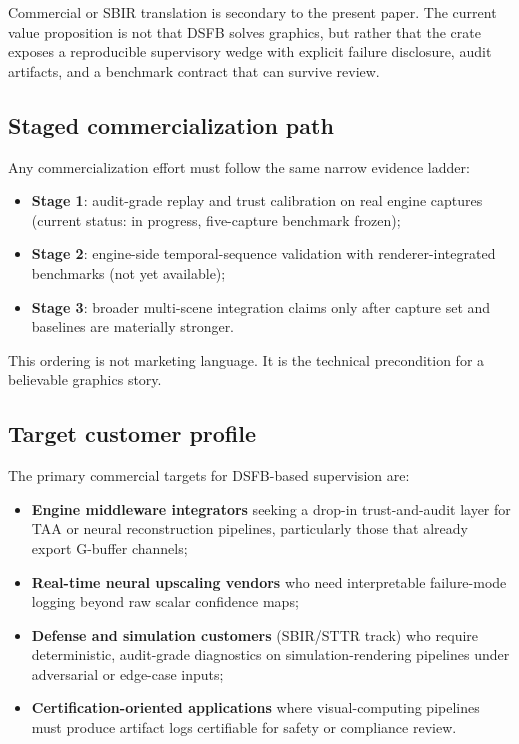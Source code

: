 \documentclass[11pt]{article}
\theoremstyle{definition}
\theoremstyle{plain}
\begin{document}
Commercial or SBIR translation is secondary to the present paper. The current value proposition is not that DSFB solves graphics, but rather that the crate exposes a reproducible supervisory wedge with explicit failure disclosure, audit artifacts, and a benchmark contract that can survive review.

\subsection{Staged commercialization path}

Any commercialization effort must follow the same narrow evidence ladder:
\begin{itemize}[leftmargin=1.5em]
    \item \textbf{Stage 1}: audit-grade replay and trust calibration on real engine captures (current status: in progress, five-capture benchmark frozen);
    \item \textbf{Stage 2}: engine-side temporal-sequence validation with renderer-integrated benchmarks (not yet available);
    \item \textbf{Stage 3}: broader multi-scene integration claims only after capture set and baselines are materially stronger.
\end{itemize}

This ordering is not marketing language. It is the technical precondition for a believable graphics story.

\subsection{Target customer profile}

The primary commercial targets for DSFB-based supervision are:
\begin{itemize}[leftmargin=1.5em]
    \item \textbf{Engine middleware integrators} seeking a drop-in trust-and-audit layer for TAA or neural reconstruction pipelines, particularly those that already export G-buffer channels;
    \item \textbf{Real-time neural upscaling vendors} who need interpretable failure-mode logging beyond raw scalar confidence maps;
    \item \textbf{Defense and simulation customers} (SBIR/STTR track) who require deterministic, audit-grade diagnostics on simulation-rendering pipelines under adversarial or edge-case inputs;
    \item \textbf{Certification-oriented applications} where visual-computing pipelines must produce artifact logs certifiable for safety or compliance review.
\end{itemize}
\end{document}
